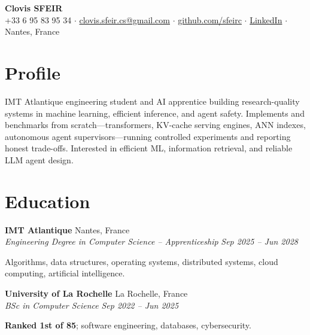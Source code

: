 \documentclass[10pt,a4paper]{article}
\newcommand{\entry}[4]{\textbf{#1} \hfill #2\\\textit{#3} \hfill \textit{#4}\par\vspace{1pt}}
\begin{document}
\fontsize{10pt}{12pt}\selectfont
\begin{center}
{\Large\bfseries Clovis SFEIR}\\[2pt]
+33 6 95 83 95 34 \; $\cdot$ \;
\href{mailto:clovis.sfeir.cs@gmail.com}{clovis.sfeir.cs@gmail.com} \; $\cdot$ \;
\href{https://github.com/sfeirc}{github.com/sfeirc} \; $\cdot$ \;
\href{https://linkedin.com/in/clovis-sfeir-388936240}{LinkedIn} \; $\cdot$ \; Nantes, France
\end{center}
\vspace{-6pt}

\section*{Profile}
IMT Atlantique engineering student and AI apprentice building research-quality systems in machine learning, efficient inference, and agent safety. Implements and benchmarks from scratch---transformers, KV-cache serving engines, ANN indexes, autonomous agent supervisors---running controlled experiments and reporting honest trade-offs. Interested in efficient ML, information retrieval, and reliable LLM agent design.

\section*{Education}
\entry{IMT Atlantique}{Nantes, France}{Engineering Degree in Computer Science -- Apprenticeship}{Sep 2025 -- Jun 2028}
Algorithms, data structures, operating systems, distributed systems, cloud computing, artificial intelligence.\par\smallskip
\entry{University of La Rochelle}{La Rochelle, France}{BSc in Computer Science}{Sep 2022 -- Jun 2025}
\textbf{Ranked 1st of 85}; software engineering, databases, cybersecurity.\par
\end{document}
